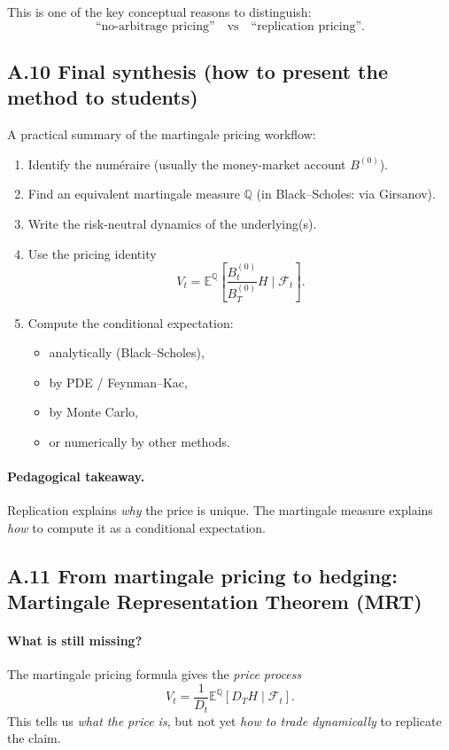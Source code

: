 \documentclass[11pt]{article}
\newcommand{\Qbb}{\mathbb{Q}}
\newcommand{\E}{\mathbb{E}}
\newcommand{\1}{\mathbf{1}}
\begin{document}
This is one of the key conceptual reasons to distinguish:
$$
\text{``no-arbitrage pricing''} \quad \text{vs} \quad \text{``replication pricing''}.
$$

\subsection*{A.10 Final synthesis (how to present the method to students)}

A practical summary of the martingale pricing workflow:

\begin{enumerate}[leftmargin=1.6em]
    \item Identify the num\'eraire (usually the money-market account \(B^{(0)}\)).
    \item Find an equivalent martingale measure \(\Qbb\) (in Black--Scholes: via Girsanov).
    \item Write the risk-neutral dynamics of the underlying(s).
    \item Use the pricing identity
    $$
    V_t=\E^{\Qbb}\!\left[\frac{B_t^{(0)}}{B_T^{(0)}}H\mid\mathcal F_t\right].
    $$
    \item Compute the conditional expectation:
    \begin{itemize}[leftmargin=1.4em]
        \item analytically (Black--Scholes),
        \item by PDE / Feynman--Kac,
        \item by Monte Carlo,
        \item or numerically by other methods.
    \end{itemize}
\end{enumerate}

\paragraph{Pedagogical takeaway.}
Replication explains \emph{why} the price is unique.
The martingale measure explains \emph{how} to compute it as a conditional expectation.

\subsection*{A.11 From martingale pricing to hedging: Martingale Representation Theorem (MRT)}

\paragraph{What is still missing?}
The martingale pricing formula gives the \emph{price process}
$$
V_t=\frac{1}{D_t}\E^{\Qbb}[D_T H\mid \mathcal F_t].
$$
This tells us \emph{what the price is}, but not yet \emph{how to trade dynamically} to replicate the claim.
\end{document}
